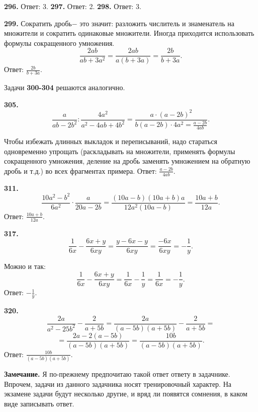 \textbf{296.} Ответ: 3. \textbf{297.} Ответ: 2. \textbf{298.} Ответ: 3.

\textbf{299.} Сократить дробь$-$ это значит: разложить числитель и знаменатель на множители и сократить одинаковые множители. Иногда приходится использовать формулы сокращенного умножения.
$$\frac{2ab}{ab+3a^2}=\frac{2ab}{a\left(b+3a\right)}=\frac{2b}{b+3a}.$$ \newline \null \hspace*{\fill} Ответ: $\frac{2b}{b+3a}$. 

Задачи \textbf{300-304} решаются аналогично. 

\textbf{305.} $$\frac{a}{ab-2b^2}:\frac{4a^2}{a^2-4ab+4b^2}=\frac{a\cdot\left(a-2b\right)^2}{b\left(a-2b\right)\cdot4a^2=\frac{a-2b}{4ab}}.$$

Чтобы избежать длинных выкладок и переписываний, надо стараться одновременно упрощать (раскладывать на множители, применять формулы сокращенного умножения, деление на дробь заменять умножением на обратную дробь и т.д.) во всех фрагментах примера. \newline \null \hspace*{\fill} Ответ: $\frac{a-2b}{4ab}$. 

\textbf{311.}  $$\frac{10a^2-b^2}{6a^2}\cdot\frac{a}{20a-2b}=\frac{\left(10a-b\right)\left(10a+b\right)a}{12a^2\left(10a-b\right)}=\frac{10a+b}{12a}.$$  \null \hspace*{\fill} Ответ: $\frac{10a+b}{12a}$.

\textbf{317.} $$\frac{1}{6x}-\frac{6x+y}{6xy}=\frac{y-6x-y}{6xy}=\frac{-6x}{6xy}=-\frac{1}{y}.$$ 

\newpage Можно и так: $$\frac{1}{6x}-\frac{6x+y}{6xy}=\frac{1}{6x}-\frac{1}{y}=\frac{1}{6x}=-\frac{1}{y}.$$  \null \hspace*{\fill} Ответ: $-\frac{1}{y}$.

\textbf{320.} $$\frac{2a}{a^2-25b^2}-\frac{2}{a+5b}=\frac{2a}{\left(a-5b\right)\left(a+5b\right)}-\frac{2}{a+5b}=$$ $$=\frac{2a-2\left(a-5b\right)}{\left(a-5b\right)\left(a+5b\right)}=\frac{10b}{\left(a-5b\right)\left(a+5b\right)}.$$ \newline \null \hspace*{\fill} Ответ: $\frac{10b}{\left(a-5b\right)\left(a+5b\right)}$.

\textbf{Замечание.} Я по-прежнему предпочитаю такой ответ ответу в задачнике. Впрочем, задачи из данного задачника носят тренировочный характер. На экзамене задачи будут несколько другие, и вряд ли появятся сомнения, в каком виде записывать ответ. 

